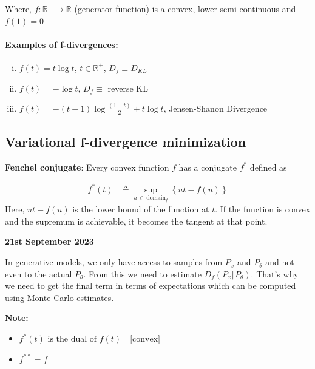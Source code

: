 \documentclass[11pt]{article}
\begin{document}
Where, $f: \mathbb{R}^+ \rightarrow \mathbb{R}$ (generator function) is a convex, lower-semi continuous and $f(1) = 0$

\paragraph{Examples of f-divergences:}
\begin{enumerate}[i)]
\item $f(t) = t \log t$, $t \in \mathbb{R}^+$, $D_f \equiv D_{KL}$
\item $f(t) = - \log t$, $D_f \equiv $ reverse KL
  
\item $f(t) = -(t + 1) \log \frac{(1 + t)}{2} + t \log t$, Jensen-Shanon Divergence
\end{enumerate}

\subsection{Variational f-divergence minimization}
\label{sec:vari-f-diverg}

\textbf{Fenchel conjugate}: Every convex function $f$ has a conjugate $f^{*}$ defined as

\begin{minipage}{0.7\textwidth}
  \begin{align*}
    f^{*}(t) &\triangleq \sup_{u\, \in\, \text{domain}_f} \left\{ ut - f(u) \right\}
  \end{align*}
  Here, $ut - f(u)$ is the lower bound of the function at $t$.
  If the function is convex and the supremum is achievable,
  it becomes the tangent at that point.
\end{minipage}
\begin{minipage}{0.3\textwidth}
\end{minipage}

\vspace{1em}
\textbf{21st September 2023}

In generative models, we only have access to samples from $P_x$ and $P_{\theta}$ and not
even to the actual $P_{\theta}$. From this we need to estimate $D_f(P_x \Vert P_{\theta})$. That's why we need to get the final term in terms of expectations which can be computed using Monte-Carlo estimates.

\textbf{Note:}
\begin{itemize}
  \item \( f^{*}(t) \text{ is the dual of } f(t)\quad \text{[convex]} \)
  \item \( f^{**} = f \)
\end{itemize}
\end{document}
